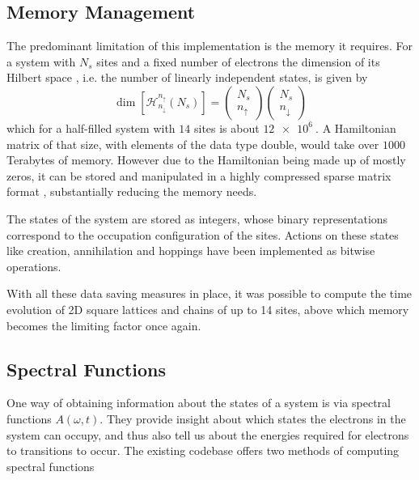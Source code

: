 \subsection{Memory Management}
The predominant limitation of this implementation is the memory it requires. For a system with $N_s$ sites and a fixed number of electrons the dimension of its Hilbert space , i.e. the number of linearly independent states, is given by 
\begin{equation}
    \dim \left[\mathcal{H}^{n_\uparrow}_{n_\downarrow} (N_s)\right] = \begin{pmatrix}N_s \\ n_\uparrow\end{pmatrix} \begin{pmatrix}N_s \\ n_\downarrow\end{pmatrix}
\end{equation}
which for a half-filled system with $14$ sites is about $\SI{12e6}{}$. A Hamiltonian matrix of that size, with elements of the data type double, would take over $1000$ Terabytes of memory. However due to the Hamiltonian being made up of mostly zeros, it can be stored and manipulated in a highly compressed sparse matrix format \cite{innerberger}, substantially reducing the memory needs.
\medskip

The states of the system are stored as integers, whose binary representations correspond to the occupation configuration of the sites. Actions on these states like creation, annihilation and hoppings have been implemented as bitwise operations.
\medskip
 
With all these data saving measures in place, it was possible to compute the time evolution of 2D square lattices and chains of up to 14 sites, above which memory becomes the limiting factor once again.


\subsection{Spectral Functions}\label{sec:spectral_functions}

One way of obtaining information about the states of a system is via spectral functions $A(\omega, t)$. They provide insight about which states the electrons in the system can occupy, and thus also tell us about the energies required for electrons to transitions to occur. The existing codebase offers two methods of computing spectral functions \cite{spectral_function}

